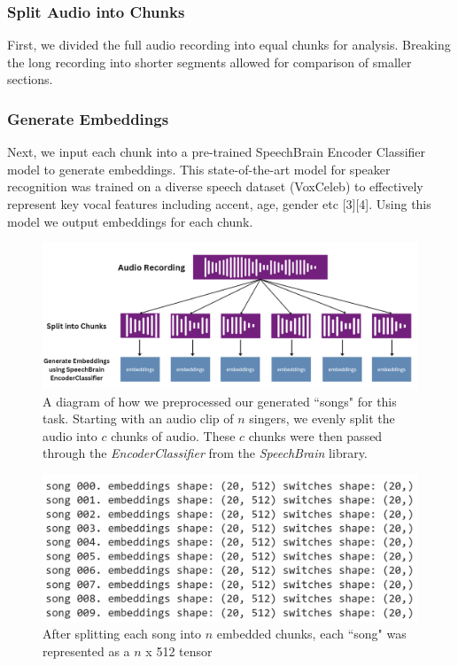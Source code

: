 \documentclass[conference]{IEEEtran}
\begin{document}
\subsubsection{Split Audio into Chunks}
First, we divided the full audio recording into equal chunks for analysis. Breaking the long recording into shorter segments allowed for comparison of smaller sections.

\subsubsection{Generate Embeddings}
Next, we input each chunk into a pre-trained SpeechBrain Encoder Classifier model to generate embeddings. This state-of-the-art model for speaker recognition was trained on a diverse speech dataset (VoxCeleb) to effectively represent key vocal features including accent, age, gender etc [3][4]. Using this model we output embeddings for each chunk.

\begin{figure}[ht]
    \centering
    \includegraphics[scale=0.25]{chunking.png}
    \caption{A diagram of how we preprocessed our generated ``songs" for this task. Starting with an audio clip of $n$ singers, we evenly split the audio into $c$ chunks of audio. These $c$ chunks were then passed through the \textit{EncoderClassifier} from the \textit{SpeechBrain} library.}
    \label{fig:chunking}
\end{figure}

\begin{figure}[ht]
    \centering
    \includegraphics[scale=0.25]{enbeddings_and_switches.png}
    \caption{After splitting each song into $n$ embedded chunks, each ``song" was represented as a $n$ x 512 tensor}
    \label{fig:embeddings}
\end{figure}
\end{document}
